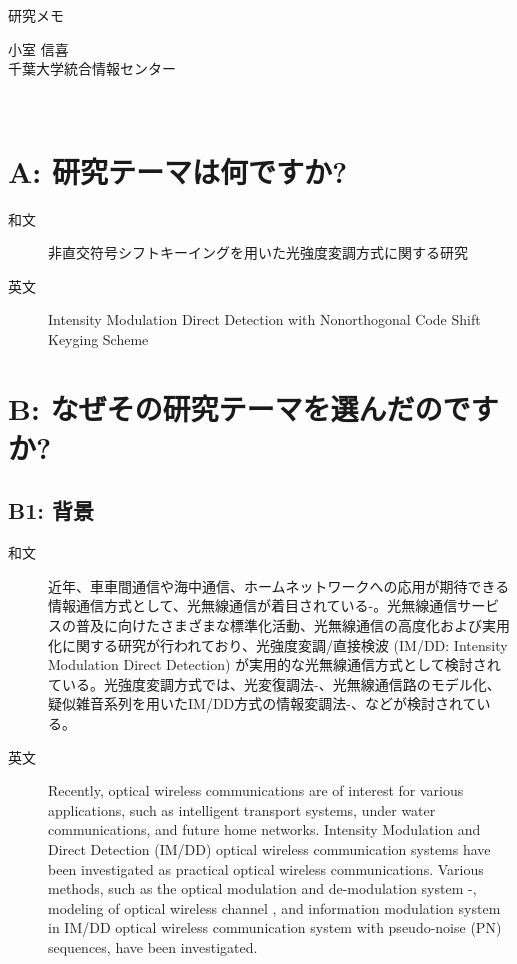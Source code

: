 ﻿\documentclass[a4j,10pt]{jarticle}
\begin{document}
\begin{center}
\large
研究メモ
\end{center}
\begin{flushright}
小室 信喜 \\
千葉大学統合情報センター
\end{flushright}
\hrulefill \\
\section{A: 研究テーマは何ですか?} %
%
\begin{description}
\item[和文] 非直交符号シフトキーイングを用いた光強度変調方式に関する研究
\item[英文] Intensity Modulation Direct Detection with Nonorthogonal Code Shift Keyging Scheme
\end{description}
%
\section{B: なぜその研究テーマを選んだのですか?}
\subsection{B1: 背景} %
\begin{description}
 \item[和文] 近年、車車間通信や海中通信、ホームネットワークへの応用が期待できる情報通信方式として、光無線通信が着目されている\cite{ocdma1}-\cite{csk2}。光無線通信サービスの普及に向けたさまざまな標準化活動、光無線通信の高度化および実用化に関する研究が行われており、光強度変調/直接検波 (IM/DD: Intensity Modulation Direct Detection) が実用的な光無線通信方式として検討されている。光強度変調方式では、光変復調法\cite{ocdma4}-\cite{scinti}、光無線通信路のモデル化\cite{ocdma5}、疑似雑音系列を用いたIM/DD方式の情報変調法\cite{ook}-\cite{sik2}、などが検討されている。
%
\item[英文] Recently, optical wireless communications are of interest for various applications, such as intelligent transport systems, under water communications, and future home networks. Intensity Modulation and Direct Detection (IM/DD) optical wireless communication systems have been investigated as practical optical wireless communications. Various methods, such as the optical modulation and de-modulation system \cite{ocdma4}-\cite{scinti}, modeling of optical wireless channel \cite{ocdma5}, and information modulation system in IM/DD optical wireless communication system with pseudo-noise (PN) sequences, have been investigated. 
\end{description}
%
\end{document}
